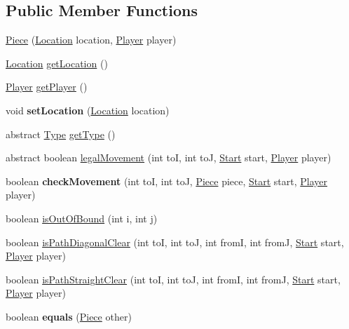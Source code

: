 \subsection*{Public Member Functions}
\begin{DoxyCompactItemize}
\item 
\mbox{\hyperlink{classgamelogic_1_1_piece_ab0442f319debc38a447e0e7f7ba3bbf8}{Piece}} (\mbox{\hyperlink{classgamelogic_1_1_location}{Location}} location, \mbox{\hyperlink{classgamelogic_1_1_player}{Player}} player)
\item 
\mbox{\hyperlink{classgamelogic_1_1_location}{Location}} \mbox{\hyperlink{classgamelogic_1_1_piece_a606b1bef122f221d40a88e7b79d54b00}{get\+Location}} ()
\item 
\mbox{\hyperlink{classgamelogic_1_1_player}{Player}} \mbox{\hyperlink{classgamelogic_1_1_piece_a8e8a7aef1b872104c0d6dd6c31474794}{get\+Player}} ()
\item 
\mbox{\label{classgamelogic_1_1_piece_af107a61ff3bf8e4641a5bfd0501dbf67}} 
void {\bfseries set\+Location} (\mbox{\hyperlink{classgamelogic_1_1_location}{Location}} location)
\item 
abstract \mbox{\hyperlink{enumgamelogic_1_1_type}{Type}} \mbox{\hyperlink{classgamelogic_1_1_piece_ada7c47c213e0f2271fbab7432cf6de51}{get\+Type}} ()
\item 
abstract boolean \mbox{\hyperlink{classgamelogic_1_1_piece_a443a86d99dabcd09c637cca2344ae3bd}{legal\+Movement}} (int toI, int toJ, \mbox{\hyperlink{classgamelogic_1_1_start}{Start}} start, \mbox{\hyperlink{classgamelogic_1_1_player}{Player}} player)
\item 
\mbox{\label{classgamelogic_1_1_piece_ae2db48886123d42187139328c1b0005a}} 
boolean {\bfseries check\+Movement} (int toI, int toJ, \mbox{\hyperlink{classgamelogic_1_1_piece}{Piece}} piece, \mbox{\hyperlink{classgamelogic_1_1_start}{Start}} start, \mbox{\hyperlink{classgamelogic_1_1_player}{Player}} player)
\item 
boolean \mbox{\hyperlink{classgamelogic_1_1_piece_a8a07aab5b997bd7b889e5eb1c72622b0}{is\+Out\+Of\+Bound}} (int i, int j)
\item 
boolean \mbox{\hyperlink{classgamelogic_1_1_piece_a001ebd45357d11f8b742a27b5f358db9}{is\+Path\+Diagonal\+Clear}} (int toI, int toJ, int fromI, int fromJ, \mbox{\hyperlink{classgamelogic_1_1_start}{Start}} start, \mbox{\hyperlink{classgamelogic_1_1_player}{Player}} player)
\item 
boolean \mbox{\hyperlink{classgamelogic_1_1_piece_a3b13e1bdba1f3db5f9e8e5d219599d6c}{is\+Path\+Straight\+Clear}} (int toI, int toJ, int fromI, int fromJ, \mbox{\hyperlink{classgamelogic_1_1_start}{Start}} start, \mbox{\hyperlink{classgamelogic_1_1_player}{Player}} player)
\item 
\mbox{\label{classgamelogic_1_1_piece_a4b84a20156cfa3c64362a19150ab35ce}} 
boolean {\bfseries equals} (\mbox{\hyperlink{classgamelogic_1_1_piece}{Piece}} other)
\end{DoxyCompactItemize}


